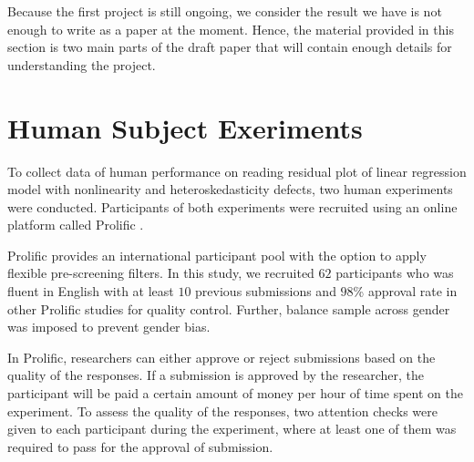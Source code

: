 \documentclass{monashthesis}
\theoremstyle{definition}
\theoremstyle{definition}
\theoremstyle{definition}
\theoremstyle{definition}
\theoremstyle{remark}
\begin{document}
Because the first project is still ongoing, we consider the result we have is not enough to write as a paper at the moment. Hence, the material provided in this section is two main parts of the draft paper that will contain enough details for understanding the project.

\hypertarget{human-subject-exeriments}{%
\section{Human Subject Exeriments}\label{human-subject-exeriments}}

To collect data of human performance on reading residual plot of linear regression model with nonlinearity and heteroskedasticity defects, two human experiments were conducted. Participants of both experiments were recruited using an online platform called Prolific \autocite{prolific_prolific_2022}.

Prolific provides an international participant pool with the option to apply flexible pre-screening filters. In this study, we recruited \(62\) participants who was fluent in English with at least \(10\) previous submissions and \(98\)\% approval rate in other Prolific studies for quality control. Further, balance sample across gender was imposed to prevent gender bias.

In Prolific, researchers can either approve or reject submissions based on the quality of the responses. If a submission is approved by the researcher, the participant will be paid a certain amount of money per hour of time spent on the experiment. To assess the quality of the responses, two attention checks were given to each participant during the experiment, where at least one of them was required to pass for the approval of submission.
\end{document}
